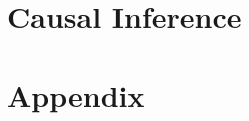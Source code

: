\documentclass[a4paper]{report}
\begin{document}
\chapter{Causal Inference}

% 
% 
% 
% 
% 
% 
% 
% 


\chapter*{Appendix}

\nocite{*} %


\end{document}
